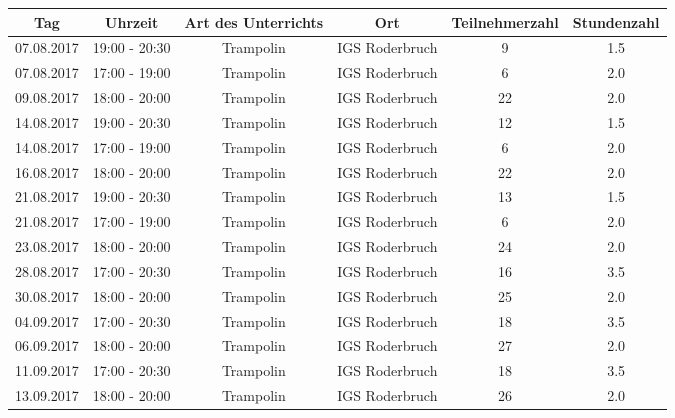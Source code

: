 \documentclass[a4paper,10pt,BCOR=0mm]{scrreprt}
\begin{document}
\begin{flushright}
\begin{tabular}{|c|c|c|c|c|c|}\hline
 \textbf{Tag}
&
 \textbf{Uhrzeit}
&
 \textbf{Art des Unterrichts}
&
\textbf{Ort}
&
\textbf{Teilnehmerzahl}
&
 \textbf{Stundenzahl}\\\hline\hline

07.08.2017
&
19:00 - 20:30
&
Trampolin
&
IGS Roderbruch
&
9
&
1.5
\\\hline


07.08.2017
&
17:00 - 19:00
&
Trampolin
&
IGS Roderbruch
&
6
&
2.0
\\\hline


09.08.2017
&
18:00 - 20:00
&
Trampolin
&
IGS Roderbruch
&
22
&
2.0
\\\hline


14.08.2017
&
19:00 - 20:30
&
Trampolin
&
IGS Roderbruch
&
12
&
1.5
\\\hline


14.08.2017
&
17:00 - 19:00
&
Trampolin
&
IGS Roderbruch
&
6
&
2.0
\\\hline


16.08.2017
&
18:00 - 20:00
&
Trampolin
&
IGS Roderbruch
&
22
&
2.0
\\\hline


21.08.2017
&
19:00 - 20:30
&
Trampolin
&
IGS Roderbruch
&
13
&
1.5
\\\hline


21.08.2017
&
17:00 - 19:00
&
Trampolin
&
IGS Roderbruch
&
6
&
2.0
\\\hline


23.08.2017
&
18:00 - 20:00
&
Trampolin
&
IGS Roderbruch
&
24
&
2.0
\\\hline


28.08.2017
&
17:00 - 20:30
&
Trampolin
&
IGS Roderbruch
&
16
&
3.5
\\\hline


30.08.2017
&
18:00 - 20:00
&
Trampolin
&
IGS Roderbruch
&
25
&
2.0
\\\hline


04.09.2017
&
17:00 - 20:30
&
Trampolin
&
IGS Roderbruch
&
18
&
3.5
\\\hline


06.09.2017
&
18:00 - 20:00
&
Trampolin
&
IGS Roderbruch
&
27
&
2.0
\\\hline


11.09.2017
&
17:00 - 20:30
&
Trampolin
&
IGS Roderbruch
&
18
&
3.5
\\\hline


13.09.2017
&
18:00 - 20:00
&
Trampolin
&
IGS Roderbruch
&
26
&
2.0
\\\hline



\end{tabular}
\end{flushright}
\end{document}
